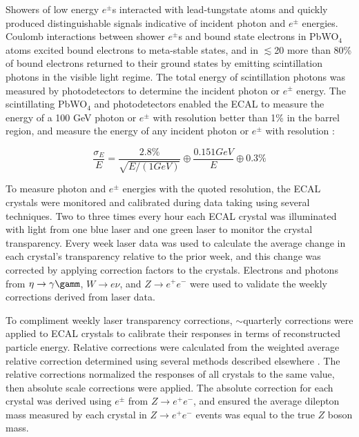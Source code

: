 Showers of low energy $e^{\pm}$s interacted with lead-tungstate atoms and quickly produced distinguishable 
signals indicative of incident photon and $e^{\pm}$ energies.  Coulomb interactions between shower $e^{\pm}$s 
and bound state electrons in PbWO$_{4}$ atoms excited bound electrons to meta-stable states, and in 
$\lesssim$20 \ns more than 80\% of bound electrons returned to their ground states by emitting scintillation 
photons in the visible light regime.  The total energy of 
scintillation photons was measured by photodetectors to determine the incident photon or $e^{\pm}$ energy.  
The scintillating PbWO$_{4}$ and photodetectors enabled the ECAL to measure the energy of a 100 GeV photon or 
$e^{\pm}$ with resolution better than 1\% in the barrel region, and measure the energy of any incident photon or $e^{\pm}$ with 
resolution \cite{eGammaMonitCalib2011}:

\begin{equation}
	\frac{\sigma_{E}}{E} = \frac{2.8\%}{\sqrt{E/(1 GeV)}} \oplus \frac{0.151 GeV}{E} \oplus 0.3\%
\end{equation}

To measure photon and $e^{\pm}$ energies with the quoted resolution, the ECAL crystals were monitored and calibrated 
during data taking using several techniques.  Two to three times every hour each ECAL crystal was illuminated 
with light from one blue laser and one green laser to monitor the crystal transparency.  Every week laser data 
was used to calculate the average change in each crystal's transparency relative to the prior week, and this change 
was corrected by applying correction factors to the crystals.  Electrons and photons from $\eta \rightarrow \gamma\gamm$, 
$W \rightarrow e\nu$, and $Z \rightarrow e^{+}e^{-}$ were used to validate the weekly corrections derived from laser data.

To compliment weekly laser transparency corrections, $\sim$quarterly corrections were applied to ECAL crystals 
to calibrate their responses in terms of reconstructed particle energy.  Relative corrections were calculated from 
the weighted average relative correction determined using several methods described elsewhere \cite{eGammaMonitCalib2011}.  
The relative corrections normalized the responses of all crystals to the same value, then absolute scale corrections 
were applied.  The absolute correction for each crystal was derived using $e^{\pm}$ from $Z \rightarrow e^{+}e^{-}$, 
and ensured the average dilepton mass measured by each crystal in $Z \rightarrow e^{+}e^{-}$ events was equal to the 
true $Z$ boson mass.

